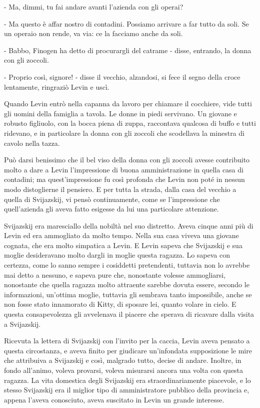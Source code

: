 - Ma, dimmi, tu fai andare avanti l'azienda con gli operai? 

- Ma questo è affar nostro di contadini. Possiamo arrivare a far tutto da soli. Se un operaio non rende, va via: ce la facciamo anche da soli. 

- Babbo, Finogen ha detto di procurargli del catrame - disse, entrando, la donna con gli zoccoli. 

- Proprio così, signore! - disse il vecchio, alzandosi, si fece il segno della croce lentamente, ringraziò Levin e uscì. 

Quando Levin entrò nella capanna da lavoro per chiamare il cocchiere, vide tutti gli uomini della famiglia a tavola. Le donne in piedi servivano. Un giovane e robusto figliuolo, con la bocca piena di zuppa, raccontava qualcosa di buffo e tutti ridevano, e in particolare la donna con gli zoccoli che scodellava la minestra di cavolo nella tazza. 

Può darsi benissimo che il bel viso della donna con gli zoccoli avesse contribuito molto a dare a Levin l'impressione di buona amministrazione in quella casa di contadini; ma quest'impressione fu così profonda che Levin non poté in nessun modo distoglierne il pensiero. E per tutta la strada, dalla casa del vecchio a quella di Svijazskij, vi pensò continuamente, come se l'impressione che quell'azienda gli aveva fatto esigesse da lui una particolare attenzione. 

Svijazskij era maresciallo della nobiltà nel suo distretto. Aveva cinque anni più di Levin ed era ammogliato da molto tempo. Nella sua casa viveva una giovane cognata, che era molto simpatica a Levin. E Levin sapeva che Svijazskij e sua moglie desideravano molto dargli in moglie questa ragazza. Lo sapeva con certezza, come lo sanno sempre i cosiddetti pretendenti, tuttavia non lo avrebbe mai detto a nessuno, e sapeva pure che, nonostante volesse ammogliarsi, nonostante che quella ragazza molto attraente sarebbe dovuta essere, secondo le informazioni, un'ottima moglie, tuttavia gli sembrava tanto impossibile, anche se non fosse stato innamorato di Kitty, di sposare lei, quanto volare in cielo. E questa consapevolezza gli avvelenava il piacere che sperava di ricavare dalla visita a Svijazskij. 

Ricevuta la lettera di Svijazskij con l'invito per la caccia, Levin aveva pensato a questa circostanza, e aveva finito per giudicare un'infondata supposizione le mire che attribuiva a Svijazskij e così, malgrado tutto, decise di andare. Inoltre, in fondo all'animo, voleva provarsi, voleva misurarsi ancora una volta con questa ragazza. La vita domestica degli Svijazskij era straordinariamente piacevole, e lo stesso Svijazskij era il miglior tipo di amministratore pubblico della provincia e, appena l'aveva conosciuto, aveva suscitato in Levin un grande interesse. 

